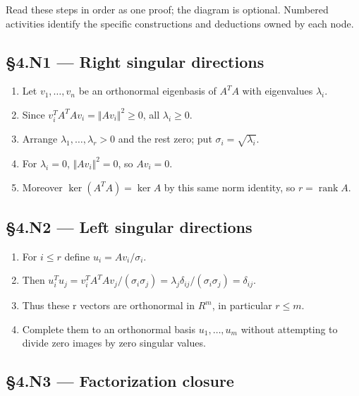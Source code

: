 \documentclass[preprint,12pt,aps,pra,showkeys,amsmath,amssymb,superscriptaddress,floatfix]{revtex4-2}
\theoremstyle{definition}
\theoremstyle{remark}
\begin{document}
Read these steps in order as one proof; the diagram is optional.
Numbered activities identify the specific constructions and deductions
owned by each node.

\subsection{§4.N1 --- Right singular
directions}\label{n1-right-singular-directions}

\begin{enumerate}
\def\labelenumi{\arabic{enumi}.}
\item
  Let \(v_{1},\ldots ,v_n\) be an orthonormal eigenbasis of \(A^{T}A\)
  with eigenvalues \(\lambda _i\).
\item
  Since \(v_i^{T}A^{T}Av_i=\Vert Av_i\Vert ^{2}\ge 0\), all
  \(\lambda _i\ge 0\).
\item
  Arrange \(\lambda _{1},\ldots ,\lambda _r>0\) and the rest zero; put
  \(\sigma _i=\sqrt{\lambda _i}\).
\item
  For \(\lambda _i=0\), \(\Vert Av_i\Vert ^{2}=0\), so \(Av_i=0\).
\item
  Moreover \(\operatorname{ker} (A^{T}A)=\operatorname{ker} A\) by this
  same norm identity, so \(r=\operatorname{rank} A\).
\end{enumerate}

\subsection{§4.N2 --- Left singular
directions}\label{n2-left-singular-directions}

\begin{enumerate}
\def\labelenumi{\arabic{enumi}.}
\item
  For \(i\le r\) define \(u_i=Av_i/\sigma _i\).
\item
  Then
  \(u_i^{T}u_j=v_i^{T}A^{T}Av_j/(\sigma _i\sigma _j)=\lambda _j\delta _{ij}/(\sigma _i\sigma _j)=\delta _{ij}\).
\item
  Thus these r vectors are orthonormal in \(R^{m}\), in particular
  \(r\le m\).
\item
  Complete them to an orthonormal basis \(u_{1},\ldots ,u_m\) without
  attempting to divide zero images by zero singular values.
\end{enumerate}

\subsection{§4.N3 --- Factorization
closure}\label{n3-factorization-closure}
\end{document}
